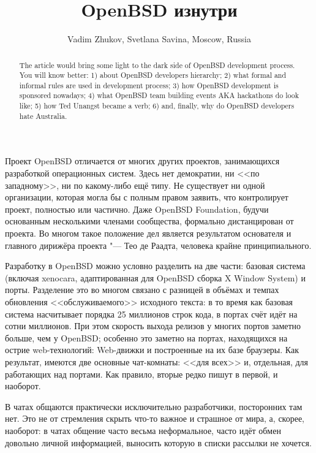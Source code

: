\documentclass[10pt, a5paper]{article}
\begin{document}
\title{OpenBSD изнутри}
\author{Vadim Zhukov, Svetlana Savina, Moscow, Russia}
\maketitle
\begin{abstract}
The article would bring some light to the dark side of OpenBSD development process. You will know better: 1) about OpenBSD developers hierarchy; 2) what formal and informal rules are used in development process; 3) how OpenBSD development is sponsored nowadays; 4) what OpenBSD team building events AKA hackathons do look like; 5) how Ted Unangst became a verb; 6) and, finally, why do OpenBSD developers hate Australia.
\end{abstract}
Проект OpenBSD отличается от многих других проектов, занимающихся разработкой операционных систем. Здесь нет демократии, ни <<по западному>>, ни по какому-либо ещё типу. Не существует ни одной организации, которая могла бы с полным правом заявить, что контролирует проект, полностью или частично. Даже OpenBSD Foundation, будучи основанным несколькими членами сообщества, формально дистанцирован от проекта. Во многом такое положение дел является результатом основателя и главного дирижёра проекта "--- Тео де Раадта, человека крайне принципиального.

Разработку в OpenBSD можно условно разделить на две части: базовая система (включая xenocara, адаптированная для OpenBSD сборка X Window System) и порты. Разделение это во многом связано с разницей в объёмах и темпах обновления <<обслуживаемого>> исходного текста: в то время как базовая система насчитывает порядка 25 миллионов строк кода, в портах счёт идёт на сотни миллионов. При этом скорость выхода релизов у многих портов заметно больше, чем у OpenBSD; особенно это заметно на портах, находящихся на острие web-технологий: Web-движки и построенные на их базе браузеры. Как результат, имеются две основные чат-комнаты: <<для всех>> и, отдельная, для работающих над портами. Как правило, вторые редко пишут в первой, и наоборот.

В чатах общаются практически исключительно разработчики, посторонних там нет. Это не от стремления скрыть что-то важное и страшное от мира, а, скорее, наоборот: в чатах общение часто весьма неформальное, часто идёт обмен довольно личной информацией, выносить которую в списки рассылки не хочется.
\end{document}
